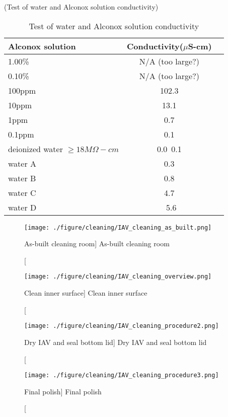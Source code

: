 (Test of water and Alconox solution conductivity)
\begin{table}
\centering
\caption{Test of water and Alconox solution conductivity}
\label{tab:AlconoxConductivity}
\begin{tabular}{lcp{5.0cm}}
Alconox solution &   Conductivity($\mu$S-cm) \\
\hline
\hline
1.00\% &  N/A (too large?)\\
\hline
0.10\% &  N/A (too large?)\\
\hline
100ppm & 102.3\\
\hline
10ppm  & 13.1\\
\hline
1ppm   & 0.7\\
\hline
0.1ppm & 0.1\\
\hline
deionized water $\geq 18M\Omega-cm$ &0.0~0.1\\
\hline
water A &0.3\\
\hline
water B &0.8\\
\hline
water C &4.7\\
\hline
water D &~5.6\\
\hline
\end{tabular}
\end{table}



\begin{figure}
    \centering
    \texttt{[image: ./figure/cleaning/IAV\_cleaning\_as\_built.png]}
    \caption
    [As-built cleaning room]
    {As-built cleaning room}
    \label{fig:IAV_cleaning_as_built.png}
    \end{figure}

\begin{figure}
    \centering
    \texttt{[image: ./figure/cleaning/IAV\_cleaning\_overview.png]}
    \caption
    [Clean inner surface]
    {Clean inner surface}
    \label{fig:IAV_cleaning_overview.png}
    \end{figure}

\begin{figure}
    \centering
    \texttt{[image: ./figure/cleaning/IAV\_cleaning\_procedure2.png]}
    \caption
    [Dry IAV and seal bottom lid]
    {Dry IAV and seal bottom lid}
    \label{fig:IAV_cleaning_procedure2.png}
    \end{figure}

\begin{figure}
    \centering
    \texttt{[image: ./figure/cleaning/IAV\_cleaning\_procedure3.png]}
    \caption
    [Final polish]
    {Final polish}
    \label{fig:IAV_cleaning_procedure3.png}
    \end{figure}

